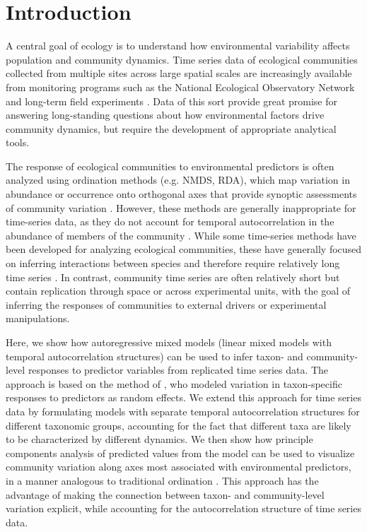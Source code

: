 \section*{Introduction}

A central goal of ecology is to understand how environmental variability affects
population and community dynamics.
Time series data of ecological communities collected from multiple sites across
large spatial scales are increasingly available from monitoring programs such as the
National Ecological Observatory Network \citep{Keller2008} and
long-term field experiments \citep[e.g.][]{Fraser2013, Cowles2018, Shi2015}.
Data of this sort provide great promise for answering long-standing questions about
how environmental factors drive community dynamics, but require the development of
appropriate analytical tools.

The response of ecological communities to environmental predictors is often analyzed
using ordination methods (e.g. NMDS, RDA), which map variation in abundance or
occurrence onto orthogonal axes that provide synoptic assessments of community
variation \citep{Mcgarigal2013}.
However, these methods are generally inappropriate for time-series data, as they
do not account for temporal autocorrelation in the abundance of members of the
community \citep{Ives2006}.
While some time-series methods have been developed for analyzing ecological communities,
these have generally focused on inferring interactions between species and therefore
require relatively long time series \citep{Ives1999, Hampton2013}.
In contrast, community time series are often relatively short but contain
replication through space or across experimental units, with the goal of
inferring the responses of communities to external drivers or experimental manipulations.

Here, we show how autoregressive mixed models (linear mixed models with temporal
autocorrelation structures) can be used to infer taxon- and community-level responses
to predictor variables from replicated time series data.
The approach is based on the method of \cite{Jackson2012}, who modeled variation in
taxon-specific responses to predictors as random effects.
We extend this approach for time series data by formulating models with separate
temporal autocorrelation structures for different taxonomic groups, accounting for
the fact that different taxa are likely to be characterized by different dynamics.
We then show how principle components analysis of predicted values from the model
can be used to visualize community variation along axes most associated with
environmental predictors, in a manner analogous to traditional ordination
\citep{Jackson2012}.
This approach has the advantage of making the connection between taxon- and
community-level variation explicit, while accounting for the autocorrelation
structure of time series data.

